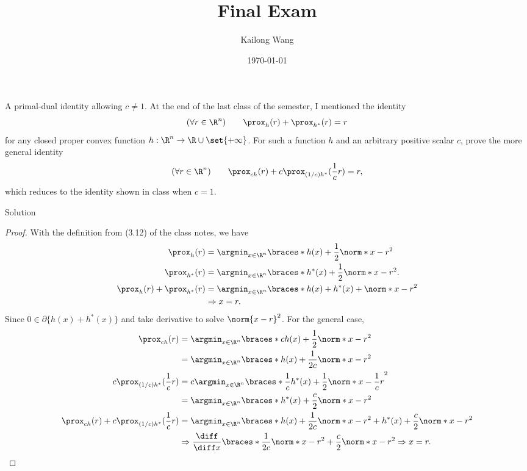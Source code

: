 \documentclass{article}
\title{Final Exam}
\author{Kailong Wang}
\date{\today}
\theoremstyle{plain}
\theoremstyle{definition}
\theoremstyle{remark}
\begin{document}
\maketitle

\begin{problem}
    {A primal-dual identity allowing $c\neq 1$.}
    At the end of the last class of the semester, I mentioned the identity
    \[(\forall r\in\R^n) \qquad \prox_h(r)+\prox_{h^*}(r)=r\]
    for any closed proper convex function $h: \R^n\rightarrow\R\cup\set{+\infty}$. For such a function $h$ and an arbitrary positive scalar $c$, prove the more general identity
    \[(\forall r\in\R^n) \qquad \prox_{ch}(r)+c\prox_{(1/c)h^*}(\frac{1}{c}r)=r,\]
    which reduces to the identity shown in class when $c=1$.
\end{problem}

\begin{solution}
    {Solution}
    \begin{proof}
        With the definition from (3.12) of the class notes, we have
        \begin{align*}
            \prox_{h}(r)&=\argmin_{x\in\R^n}\braces*{h(x)+\frac{1}{2}\norm*{x-r}^2} \\
            \prox_{h^*}(r)&=\argmin_{x\in\R^n}\braces*{h^*(x)+\frac{1}{2}\norm*{x-r}^2}. \\
            \prox_{h}(r)+\prox_{h^*}(r)&=\argmin_{x\in\R^n}\braces*{h(x)+h^*(x)+\norm*{x-r}^2} \\
            &\Rightarrow x=r.
        \end{align*}
        Since $0\in \partial\{h(x)+h^*(x)\}$ and take derivative to solve $\norm{x-r}^2$. For the general case,
        \begin{align*}
            \prox_{ch}(r)
            &= \argmin_{x\in\R^n}\braces*{ch(x)+\frac{1}{2}\norm*{x-r}^2} \\
            &= \argmin_{x\in\R^n}\braces*{h(x)+\frac{1}{2c}\norm*{x-r}^2} \\
            c \prox_{(1/c)h^*}(\frac{1}{c}r)
            &= c \argmin_{x\in\R^n}\braces*{\frac{1}{c}h^*(x)+\frac{1}{2}\norm*{x-\frac{1}{c}r}^2} \\
            &= \argmin_{x\in\R^n}\braces*{h^*(x)+\frac{c}{2}\norm*{x-r}^2} \\
            \prox_{ch}(r)+c \prox_{(1/c)h^*}(\frac{1}{c}r)
            &= \argmin_{x\in\R^n}\braces*{h(x)+\frac{1}{2c}\norm*{x-r}^2+h^*(x)+\frac{c}{2}\norm*{x-r}^2} \\
            &\Rightarrow \frac{\diff}{\diff x}\braces*{\frac{1}{2c}\norm*{x-r}^2+\frac{c}{2}\norm*{x-r}^2} \Rightarrow x=r.
        \end{align*}
    \end{proof}
\end{solution}
\end{document}

